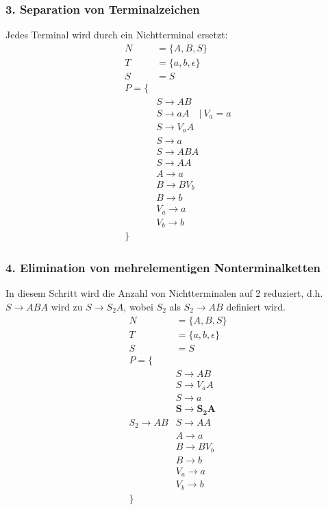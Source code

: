 \subsubsection{3. Separation von Terminalzeichen}
Jedes Terminal wird durch ein Nichtterminal ersetzt:
\begin{align*}
    N&=\{A,B,S\}\\
    T&=\{a,b,\epsilon\}\\
    S&=S\\
    P=\{\\
    &S\to AB\\
    &S\to aA \quad |\ V_a = a\\
    &S\to V_{a}A\\
    &S\to a\\
    &S\to ABA\\
    &S\to AA\\
    &A\to a\\
    &B\to BV_b\\
    &B\to b\\
    &V_a\to a\\
    &V_b\to b\\
    \}
\end{align*}
\subsubsection{4. Elimination von mehrelementigen Nonterminalketten}
In diesem Schritt wird die Anzahl von Nichtterminalen auf 2 reduziert, d.h. $S\to ABA$ wird zu $S\to S_2A$, wobei $S_2$ als $S_2\to AB$ definiert wird.
\begin{align*}
    N&=\{A,B,S\}\\
    T&=\{a,b,\epsilon\}\\
    S&=S\\
    P=\{\\
    &S\to AB\\
    &S\to V_{a}A\\
    &S\to a\\
    &\mathbf{S\to S_2A}\\
    S_2\to AB
    &S\to AA\\
    &A\to a\\
    &B\to BV_b\\
    &B\to b\\
    &V_a\to a\\
    &V_b\to b\\
    \}
\end{align*}
\fi
